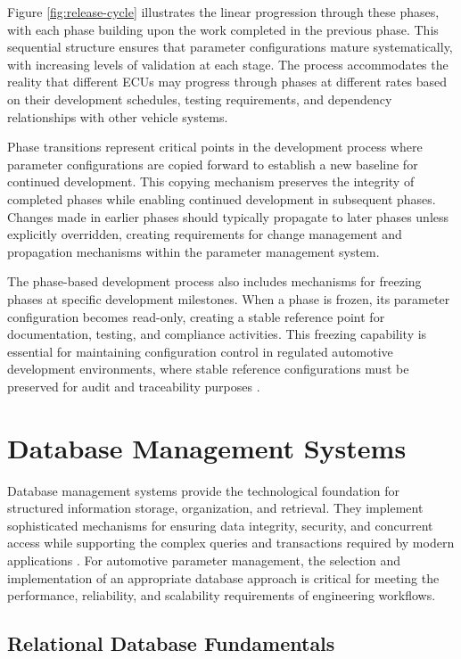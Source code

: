 Figure \ref{fig:release-cycle} illustrates the linear progression through these phases, with each phase building upon the work completed in the previous phase. This sequential structure ensures that parameter configurations mature systematically, with increasing levels of validation at each stage. The process accommodates the reality that different \acp{ECU} may progress through phases at different rates based on their development schedules, testing requirements, and dependency relationships with other vehicle systems.

Phase transitions represent critical points in the development process where parameter configurations are copied forward to establish a new baseline for continued development. This copying mechanism preserves the integrity of completed phases while enabling continued development in subsequent phases. Changes made in earlier phases should typically propagate to later phases unless explicitly overridden, creating requirements for change management and propagation mechanisms within the parameter management system.

The phase-based development process also includes mechanisms for freezing phases at specific development milestones. When a phase is frozen, its parameter configuration becomes read-only, creating a stable reference point for documentation, testing, and compliance activities. This freezing capability is essential for maintaining configuration control in regulated automotive development environments, where stable reference configurations must be preserved for audit and traceability purposes \cite{staron2021automotive}.

\section{Database Management Systems}
\label{sec:database-management-systems}

Database management systems provide the technological foundation for structured information storage, organization, and retrieval. They implement sophisticated mechanisms for ensuring data integrity, security, and concurrent access while supporting the complex queries and transactions required by modern applications \cite{sciore2009database}. For automotive parameter management, the selection and implementation of an appropriate database approach is critical for meeting the performance, reliability, and scalability requirements of engineering workflows.

\subsection{Relational Database Fundamentals}
\label{subsec:relational-database-fundamentals}

